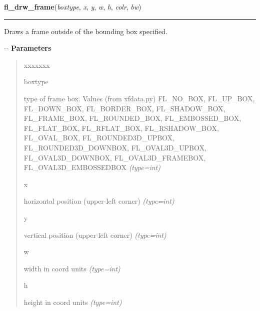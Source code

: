     \label{xformslib:flxbasic:fl_drw_frame}

    \vspace{0.5ex}

\hspace{.8\funcindent}\begin{boxedminipage}{\funcwidth}

    \raggedright \textbf{fl\_drw\_frame}(\textit{boxtype}, \textit{x}, \textit{y}, \textit{w}, \textit{h}, \textit{colr}, \textit{bw})

    \vspace{-1.5ex}

    \rule{\textwidth}{0.5\fboxrule}
\setlength{\parskip}{2ex}

Draws a frame outside of the bounding box specified.

-{}-
\setlength{\parskip}{1ex}
      \textbf{Parameters}
      \vspace{-1ex}

      \begin{quote}
        \begin{Ventry}{xxxxxxx}

          \item[boxtype]


type of frame box. Values (from xfdata.py) FL\_NO\_BOX, FL\_UP\_BOX,
FL\_DOWN\_BOX, FL\_BORDER\_BOX, FL\_SHADOW\_BOX, FL\_FRAME\_BOX,
FL\_ROUNDED\_BOX, FL\_EMBOSSED\_BOX, FL\_FLAT\_BOX, FL\_RFLAT\_BOX,
FL\_RSHADOW\_BOX, FL\_OVAL\_BOX, FL\_ROUNDED3D\_UPBOX, FL\_ROUNDED3D\_DOWNBOX,
FL\_OVAL3D\_UPBOX, FL\_OVAL3D\_DOWNBOX, FL\_OVAL3D\_FRAMEBOX,
FL\_OVAL3D\_EMBOSSEDBOX
            {\it (type=int)}

          \item[x]


horizontal position (upper-left corner)
            {\it (type=int)}

          \item[y]


vertical position (upper-left corner)
            {\it (type=int)}

          \item[w]


width in coord units
            {\it (type=int)}

          \item[h]


height in coord units
            {\it (type=int)}


\end{Ventry}
\end{quote}
\end{boxedminipage}

